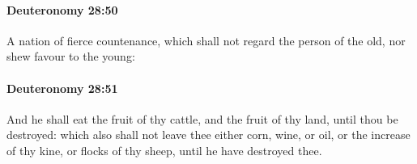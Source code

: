 		\paragraph{Deuteronomy 28:50} %
			\label{DEUTERONOMY-28-50}

			A nation of fierce countenance, which shall not regard the person of the old, nor shew favour to the young:


		\paragraph{Deuteronomy 28:51} %
			\label{DEUTERONOMY-28-51}

			And he shall eat the fruit of thy cattle, and the fruit of thy land, until thou be destroyed: which also shall not leave thee either corn, wine, or oil, or the increase of thy kine, or flocks of thy sheep, until he have destroyed thee.

